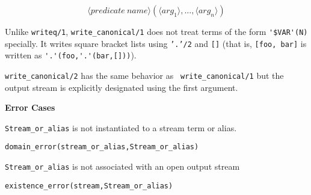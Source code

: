 \begin{description}
		\[ \langle predicate\ name \rangle
			(\langle arg_1 \rangle, \ldots,
			 \langle arg_n \rangle) \]

    Unlike {\tt writeq/1}, {\tt write\_canonical/1} does not treat terms 
    of the form \verb|'$VAR'(N)| specially. It writes square bracket lists 
    using {\tt '.'/2} and {\tt []} (that is, {\tt [foo, bar]} is written 
    as \verb|'.'(foo,'.'(bar,[]))|).

{\tt write\_canonical/2} has the same behavior as {\tt
write\_canonical/1} but the output stream is explicitly designated
using the first argument.

{\bf Error Cases} 
\bi
\item 	{\tt Stream\_or\_alias} is not instantiated to a stream term or alias.
\bi
\item 	{\tt domain\_error(stream\_or\_alias,Stream\_or\_alias)}
\ei
\item 	{\tt Stream\_or\_alias} is not associated with an open output stream
\bi
\item 	{\tt existence\_error(stream,Stream\_or\_alias)}
\ei
\ei



\end{description}
